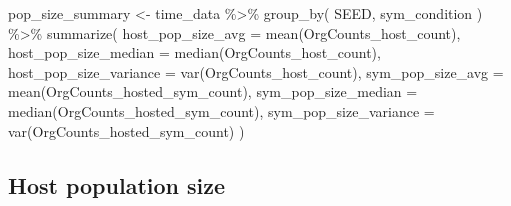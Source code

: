 \documentclass[
]{book}
\newenvironment{Shaded}{\begin{snugshade}}{\end{snugshade}}
\newcommand{\AttributeTok}[1]{\textcolor[rgb]{0.77,0.63,0.00}{#1}}
\newcommand{\FunctionTok}[1]{\textcolor[rgb]{0.00,0.00,0.00}{#1}}
\newcommand{\NormalTok}[1]{#1}
\newcommand{\OtherTok}[1]{\textcolor[rgb]{0.56,0.35,0.01}{#1}}
\newcommand{\SpecialCharTok}[1]{\textcolor[rgb]{0.00,0.00,0.00}{#1}}
\begin{document}
\begin{Shaded}
\begin{Highlighting}[]
\NormalTok{pop\_size\_summary }\OtherTok{\textless{}{-}}\NormalTok{ time\_data }\SpecialCharTok{\%\textgreater{}\%}
  \FunctionTok{group\_by}\NormalTok{(}
\NormalTok{    SEED,}
\NormalTok{    sym\_condition}
\NormalTok{  ) }\SpecialCharTok{\%\textgreater{}\%}
  \FunctionTok{summarize}\NormalTok{(}
    \AttributeTok{host\_pop\_size\_avg =} \FunctionTok{mean}\NormalTok{(OrgCounts\_host\_count),}
    \AttributeTok{host\_pop\_size\_median =} \FunctionTok{median}\NormalTok{(OrgCounts\_host\_count),}
    \AttributeTok{host\_pop\_size\_variance =} \FunctionTok{var}\NormalTok{(OrgCounts\_host\_count),}
    \AttributeTok{sym\_pop\_size\_avg =} \FunctionTok{mean}\NormalTok{(OrgCounts\_hosted\_sym\_count),}
    \AttributeTok{sym\_pop\_size\_median =} \FunctionTok{median}\NormalTok{(OrgCounts\_hosted\_sym\_count),}
    \AttributeTok{sym\_pop\_size\_variance =} \FunctionTok{var}\NormalTok{(OrgCounts\_hosted\_sym\_count)}
\NormalTok{  )}
\end{Highlighting}
\end{Shaded}

\hypertarget{host-population-size}{%
\subsection{Host population size}\label{host-population-size}}
\end{document}
